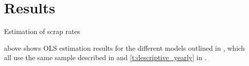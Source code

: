 \section{Results}
\label{s:results}
\begin{table}
    \centering
    \caption{Estimation of scrap rates}
    \label{t:results}
    
\end{table}
 above shows OLS estimation results for the different models outlined in , which all use the same sample described in  and \ref{t:descriptive_yearly} in .
